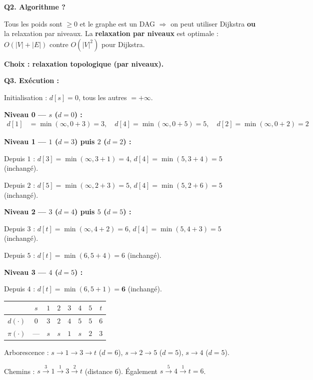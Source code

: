 \documentclass[12pt,a4paper]{article}
\begin{document}
\begin{correction}
\textbf{Q2. Algorithme ?}

Tous les poids sont $\geq 0$ et le graphe est un DAG $\Rightarrow$ on peut utiliser Dijkstra \textbf{ou} la relaxation par niveaux. La \textbf{relaxation par niveaux} est optimale : $O(|V|+|E|)$ contre $O(|V|^2)$ pour Dijkstra.

\textbf{Choix : relaxation topologique (par niveaux).}

\medskip
\textbf{Q3. Ex\'ecution :}

Initialisation : $d[s]=0$, tous les autres $= +\infty$.

\textbf{Niveau 0 --- $s$ ($d=0$) :}
\begin{align*}
d[1] &= \min(\infty, 0+3) = 3,\quad d[4] = \min(\infty, 0+5) = 5,\quad d[2] = \min(\infty, 0+2) = 2
\end{align*}

\textbf{Niveau 1 --- $1$ ($d=3$) puis $2$ ($d=2$) :}

Depuis $1$ : $d[3] = \min(\infty, 3+1) = 4$, $d[4] = \min(5, 3+4) = 5$ (inchang\'e).

Depuis $2$ : $d[5] = \min(\infty, 2+3) = 5$, $d[4] = \min(5, 2+6) = 5$ (inchang\'e).

\textbf{Niveau 2 --- $3$ ($d=4$) puis $5$ ($d=5$) :}

Depuis $3$ : $d[t] = \min(\infty, 4+2) = 6$, $d[4] = \min(5, 4+3) = 5$ (inchang\'e).

Depuis $5$ : $d[t] = \min(6, 5+4) = 6$ (inchang\'e).

\textbf{Niveau 3 --- $4$ ($d=5$) :}

Depuis $4$ : $d[t] = \min(6, 5+1) = \mathbf{6}$ (inchang\'e).

\begin{center}
\renewcommand{\arraystretch}{1.2}
\begin{tabular}{|c|c|c|c|c|c|c|c|}
\hline
& $s$ & $1$ & $2$ & $3$ & $4$ & $5$ & $t$ \\\hline
$d(\cdot)$ & $0$ & $3$ & $2$ & $4$ & $5$ & $5$ & $6$ \\\hline
$\pi(\cdot)$ & --- & $s$ & $s$ & $1$ & $s$ & $2$ & $3$ \\\hline
\end{tabular}
\end{center}

Arborescence : $s \to 1 \to 3 \to t$ ($d=6$), $s \to 2 \to 5$ ($d=5$), $s \to 4$ ($d=5$).

Chemins : $s \xrightarrow{3} 1 \xrightarrow{1} 3 \xrightarrow{2} t$ (distance 6). \'Egalement $s \xrightarrow{5} 4 \xrightarrow{1} t = 6$.


\end{correction}
\end{document}
